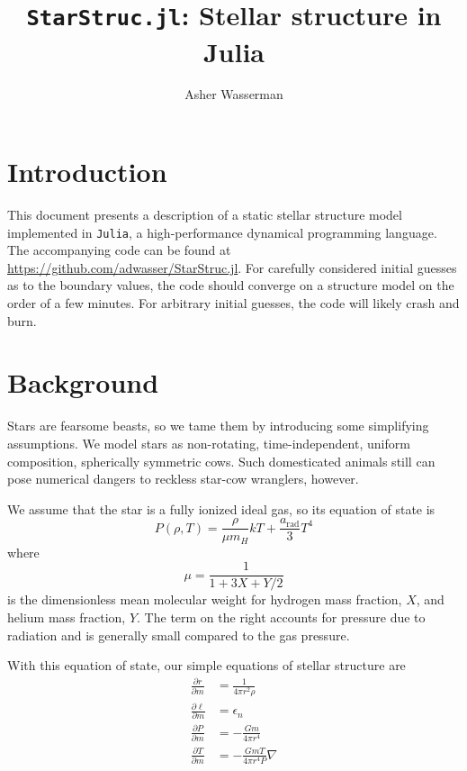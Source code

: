 \documentclass[onecolumn]{article}
\title{\texttt{StarStruc.jl}: Stellar structure in Julia}
\author{Asher Wasserman}
\date{}
\newcommand{\D}[2]{\ensuremath{\frac{\partial #1}{\partial #2}}}
\begin{document}
\maketitle

\section{Introduction}

This document presents a description of a static stellar structure model implemented in \texttt{Julia}, a high-performance dynamical programming language.  The accompanying code can be found at \url{https://github.com/adwasser/StarStruc.jl}.  For carefully considered initial guesses as to the boundary values, the code should converge on a structure model on the order of a few minutes.  For arbitrary initial guesses, the code will likely crash and burn.

\section{Background}

Stars are fearsome beasts, so we tame them by introducing some simplifying assumptions.  We model stars as non-rotating, time-independent, uniform composition, spherically symmetric cows.  Such domesticated animals still can pose numerical dangers to reckless star-cow wranglers, however.

We assume that the star is a fully ionized ideal gas, so its equation of state is
\begin{equation}
  P(\rho, T) = \frac{\rho}{\mu m_H} kT + \frac{a_\text{rad}}{3} T^4
\end{equation}
where 
\begin{equation}
  \mu = \frac{1}{1 + 3X + Y/2}
\end{equation}
is the dimensionless mean molecular weight for hydrogen mass fraction, $X$, and helium mass fraction, $Y$.  The term on the right accounts for pressure due to radiation and is generally small compared to the gas pressure.

With this equation of state, our simple equations of stellar structure are
\begin{align}
  \D{r}{m} &= \frac{1}{4\pi r^2 \rho} \\
  \D{\ell}{m} &= \epsilon_n \nonumber \\
  \D{P}{m} &= -\frac{Gm}{4\pi r^4} \nonumber \\
  \D{T}{m} &= -\frac{GmT}{4\pi r^4P} \nabla \nonumber
\end{align}
\end{document}
